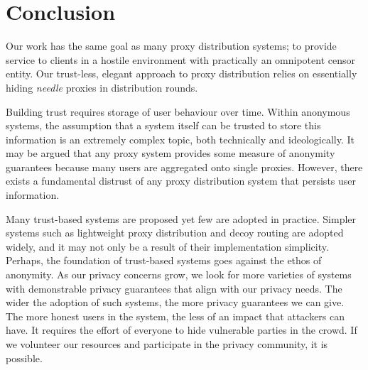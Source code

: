 \chapter{Conclusion}
\label{sec:conclusion}

Our work has the same goal as many proxy distribution systems; to provide service to clients in a hostile environment with practically an omnipotent censor entity. Our trust-less, elegant approach to proxy distribution relies on essentially hiding \textit{needle} proxies in distribution rounds.

Building trust requires storage of user behaviour over time. Within anonymous systems, the assumption that a system itself can be trusted to store this information is an extremely complex topic, both technically and ideologically. It may be argued that any proxy system provides some measure of anonymity guarantees because many users are aggregated onto single proxies. However, there exists a fundamental distrust of any proxy distribution system that persists user information.

Many trust-based systems are proposed yet few are adopted in practice. Simpler systems such as lightweight proxy distribution and decoy routing are adopted widely, and it may not only be a result of their implementation simplicity. Perhaps, the foundation of trust-based systems goes against the ethos of anonymity. As our privacy concerns grow, we look for more varieties of systems with demonstrable privacy guarantees that align with our privacy needs. The wider the adoption of such systems, the more privacy guarantees we can give. The more honest users in the system, the less of an impact that attackers can have. It requires the effort of everyone to hide vulnerable parties in the crowd. If we volunteer our resources and participate in the privacy community, it is possible.
